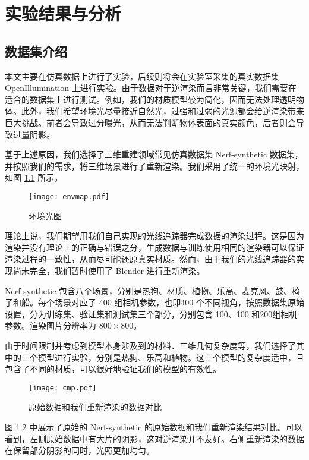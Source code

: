 
\chapter{实验结果与分析}

\section{数据集介绍}

本文主要在仿真数据上进行了实验，后续则将会在实验室采集的真实数据集 OpenIllumination\cite{liu2024openillumination} 上进行实验。由于数据对于逆渲染而言非常关键，我们需要在适合的数据集上进行测试。例如，我们的材质模型较为简化，因而无法处理透明物体。此外，我们希望环境光尽量接近自然光，过强和过弱的光源都会给逆渲染带来巨大挑战。前者会导致过分曝光，从而无法判断物体表面的真实颜色，后者则会导致过量阴影。

基于上述原因，我们选择了三维重建领域常见仿真数据集 Nerf-synthetic\cite{nerf} 数据集，并按照我们的需求，将三维场景进行了重新渲染。我们采用了统一的环境光映射，如图 \ref{fig:envmap} 所示。

\begin{figure}
  \centering
  \texttt{[image: envmap.pdf]}
  \caption{环境光图}
  \label{fig:envmap}
\end{figure}

理论上说，我们期望用我们自己实现的光线追踪器完成数据的渲染过程。这是因为渲染并没有理论上的正确与错误之分，生成数据与训练使用相同的渲染器可以保证渲染过程的一致性，从而尽可能还原真实材质。然而，由于我们的光线追踪器的实现尚未完全，我们暂时使用了 Blender \cite{blender} 进行重新渲染。

Nerf-synthetic 包含八个场景，分别是热狗、材质、植物、乐高、麦克风、鼓、椅子和船。每个场景对应了 400 组相机参数，也即400 个不同视角，按照数据集原始设置，分为训练集、验证集和测试集三个部分，分别包含 100、100 和200组相机参数。渲染图片分辨率为 $800\times 800$。

由于时间限制并考虑到模型本身涉及到的材料、三维几何复杂度等，我们选择了其中的三个模型进行实验，分别是热狗、乐高和植物。这三个模型的复杂度适中，且包含了不同的材质，可以很好地验证我们的模型的有效性。

\begin{figure}
  \centering
  \texttt{[image: cmp.pdf]}
  \caption{原始数据和我们重新渲染的数据对比}
  \label{fig:cmp}
\end{figure}

图 \ref{fig:cmp} 中展示了原始的 Nerf-synthetic 的原始数据和我们重新渲染结果对比。可以看到，左侧原始数据中有大片的阴影，这对逆渲染并不友好。右侧重新渲染的数据在保留部分阴影的同时，光照更加均匀。

